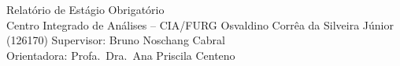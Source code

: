 \documentclass[12pt]{article}
\begin{document}
\capa
    {Relatório de Estágio Obrigatório\\[0.3cm]Centro Integrado de Análises -- CIA/FURG}
    {Osvaldino Corrêa da Silveira Júnior (126170)}
    {Supervisor: Bruno Noschang Cabral\\Orientadora: Profa.\ Dra.\ Ana Priscila Centeno}

\pagestyle{empty}
\renewcommand{\contentsname}{\hfill\bfseries SUMÁRIO\hfill}
\tableofcontents
\newpage
\pagestyle{fancy}

















\end{document}
